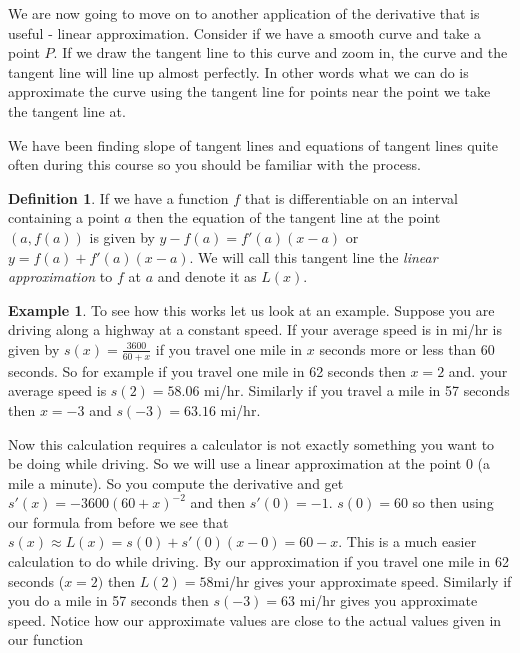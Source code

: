 \documentclass[12pt,reqno]{article}
\theoremstyle{definition}
\newtheorem*{Definition}{Definition}
\newtheorem*{Example}{Example}
\begin{document}
We are now going to move on to another application of the derivative that is useful - linear approximation. Consider if we have a smooth curve and take a point $P$. If we draw the tangent line to this curve and zoom in, the curve and the tangent line will line up almost perfectly. In other words what we can do is approximate the curve using the tangent line for points near the point we take the tangent line at. 

We have been finding slope of tangent lines and equations of tangent lines quite often during this course so you should be familiar with the process.
\begin{Definition}
If we have a function $f$ that is differentiable on an interval containing a point $a$ then the equation of the tangent line at the point $(a, f(a))$ is given by $ y - f(a) = f'(a) (x - a)$ or $y = f(a) + f'(a) (x - a)$. We will call this tangent line the \textit{linear approximation} to $f$ at $a$ and denote it as $L(x)$. 
\end{Definition}

\begin{Example}
	To see how this works let us look at an example. Suppose you are driving along a highway at a constant speed. If your average speed is in mi/hr is given by $s(x) = \frac{3600}{60 + x}$ if you travel one mile in $x$ seconds more or less than 60 seconds. So for example if you travel one mile in 62 seconds then $x = 2$ and. your average speed is $s(2) = 58.06$ mi/hr. Similarly if you travel a mile in 57 seconds then $x = -3$ and $s(-3) = 63.16$ mi/hr. 
	
	Now this calculation requires a calculator is not exactly something you want to be doing while driving. So we will use a linear approximation at the point 0 (a mile a minute). So you compute the derivative and get $s'(x) = -3600(60 + x)^{-2}$ and then $s'(0) = -1$. $s(0) = 60$ so then using our formula from before we see that $s(x) \approx L(x) = s(0) + s'(0)(x - 0) = 60 - x$. This is a much easier calculation to do while driving. By our approximation if you travel one mile in 62 seconds ($x = 2)$ then $L(2) = 58$mi/hr gives your approximate speed. Similarly if you do a mile in 57 seconds then $s(-3) = 63$ mi/hr gives you approximate speed. Notice how our approximate values are close to the actual values given in our function
\end{Example}
\end{document}
